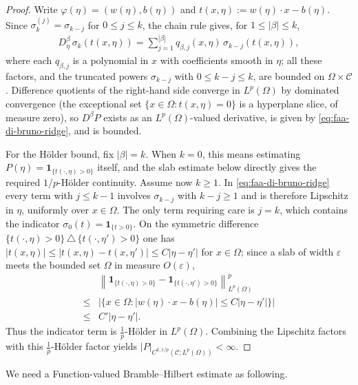 \documentclass[12pt]{article}
\numberwithin{equation}{section}
\numberwithin{figure}{section}
\numberwithin{equation}{section}
\newcommand{\Ccal}{\mathcal C}
\newcommand{\norm}[1]{\left\|#1\right\|}
\newcommand{\abs}[1]{\left|#1\right|}
\begin{document}
\begin{proof}
Write $\varphi(\eta)=(w(\eta),b(\eta))$ and $t(x,\eta):=w(\eta)\cdot x-b(\eta)$.
Since $\sigma_k^{(j)}=\sigma_{k-j}$ for $0\le j\le k$, the chain rule gives, for
$1\le\abs\beta\le k$,
\begin{align}
    D^\beta_\eta\,\sigma_k(t(x,\eta))
    =\sum_{j=1}^{\abs\beta} q_{\beta,j}(x,\eta)\,\sigma_{k-j}(t(x,\eta)),
    \label{eq:faa-di-bruno-ridge}
\end{align}
where each $q_{\beta,j}$ is a polynomial in $x$ with coefficients smooth in
$\eta$; all these factors, and the truncated powers $\sigma_{k-j}$ with
$0\le k-j\le k$, are bounded on $\Omega\times\Ccal$. Difference quotients of the
right-hand side converge in $L^p(\Omega)$ by dominated convergence (the
exceptional set $\{x\in\Omega:t(x,\eta)=0\}$ is a hyperplane slice, of measure
zero), so $D^\beta P$ exists as an $L^p(\Omega)$-valued derivative, is given by
\eqref{eq:faa-di-bruno-ridge}, and is bounded.

For the H\"older bound, fix $\abs\beta=k$. When $k=0$, this means estimating
$P(\eta)=\mathbf 1_{\{t(\cdot,\eta)>0\}}$ itself, and the slab estimate below
directly gives the required $1/p$-H\"older continuity. Assume now $k\ge1$. In
\eqref{eq:faa-di-bruno-ridge} every term with $j\le k-1$ involves
$\sigma_{k-j}$ with $k-j\ge1$ and is therefore Lipschitz in $\eta$, uniformly over
$x\in\Omega$. The only term requiring care is $j=k$, which contains the indicator
$\sigma_0(t)=\mathbf 1_{\{t>0\}}$. On the symmetric difference
$\{t(\cdot,\eta)>0\}\,\triangle\,\{t(\cdot,\eta')>0\}$ one has
$\abs{t(x,\eta)}\le\abs{t(x,\eta)-t(x,\eta')}\le C\abs{\eta-\eta'}$ for
$x\in\Omega$; since a slab of width $\varepsilon$ meets the bounded set $\Omega$
in measure $O(\varepsilon)$,
\begin{align*}
    &\norm{\mathbf 1_{\{t(\cdot,\eta)>0\}}-\mathbf 1_{\{t(\cdot,\eta')>0\}}}_{L^p(\Omega)}^p \\
    \le &\big|\{x\in\Omega:\abs{w(\eta)\cdot x-b(\eta)}\le C\abs{\eta-\eta'}\}\big| \\
    \le &C'\abs{\eta-\eta'}.
\end{align*}
Thus the indicator term is $\tfrac1p$-H\"older in $L^p(\Omega)$. Combining the
Lipschitz factors with this $\tfrac1p$-H\"older factor yields
$\abs{P}_{C^{k,1/p}(\Ccal;L^p(\Omega))}<\infty$.
\end{proof}
We need a Function-valued Bramble--Hilbert estimate as following.
\end{document}
